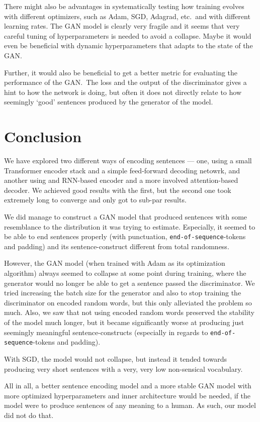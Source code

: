 \documentclass{article}
\begin{document}
There might also be advantages in systematically testing how training evolves
with different optimizers, such as Adam, SGD, Adagrad, etc.\ and with different
learning rates. The GAN model is clearly very fragile and it seems that very
careful tuning of hyperparameters is needed to avoid a collapse. Maybe it would
even be beneficial with dynamic hyperparameters that adapts to the state of the
GAN.\

Further, it would also be beneficial to get a better metric for evaluating the
performance of the GAN.\ The loss and the output of the discriminator gives a
hint to how the network is doing, but often it does not directly relate to how
seemingly `good' sentences produced by the generator of the model.

\section{Conclusion}\label{sec:conclusion}
We have explored two different ways of encoding sentences --- one, using a small
Transformer encoder stack and a simple feed-forward decoding netowrk, and
another using and RNN-based encoder and a more involved attention-based decoder.
We achieved good results with the first, but the second one took extremely long
to converge and only got to sub-par results.

We did manage to construct a GAN model that produced sentences with some
resemblance to the distribution it was trying to estimate. Especially, it seemed
to be able to end sentences properly (with punctuation,
\texttt{end-of-sequence}-tokens and padding) and its sentence-construct
different from total randomness.

However, the GAN model (when trained with Adam as its optimization algorithm)
always seemed to collapse at some point during training, where the generator
would no longer be able to get a sentence passed the discriminator. We tried
increasing the batch size for the generator and also to stop training the
discriminator on encoded random words, but this only alleviated the problem so
much. Also, we saw that not using encoded random words preserved the stability
of the model much longer, but it became significantly worse at producing just
seemingly meaningful sentence-constructs (especially in regards to
\texttt{end-of-sequence}-tokens and padding).

With SGD, the model would not collapse, but instead it tended towards producing
very short sentences with a very, very low non-sensical vocabulary.

All in all, a better sentence encoding model and a more stable GAN model with
more optimized hyperparameters and inner architecture would be needed, if the
model were to produce sentences of any meaning to a human. As such, our model
did not do that.

\newpage
\printbibliography%
\end{document}

